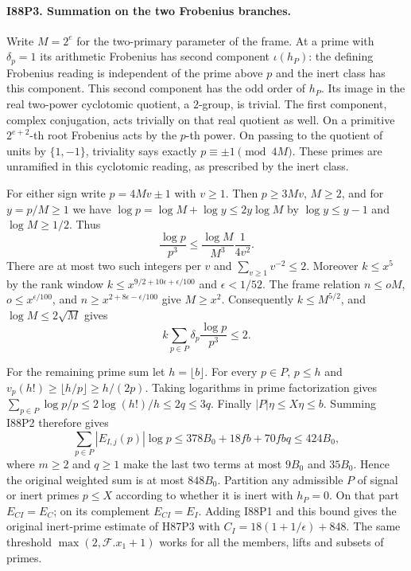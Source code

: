 \paragraph{I88P3. Summation on the two Frobenius branches.}
Write $M=2^e$ for the two-primary parameter of the frame. At a
prime with $\delta_p=1$ its arithmetic Frobenius has second
component $\iota(h_P)$: the defining Frobenius reading is independent
of the prime above $p$ and the inert class has this component.
This second component has the odd order of $h_P$. Its image in the
real two-power cyclotomic quotient, a $2$-group, is trivial.
The first component, complex conjugation, acts trivially on that
real quotient as well.
On a primitive $2^{e+2}$-th root Frobenius acts by the $p$-th power.
On passing to the quotient of units by $\{1,-1\}$, triviality
says exactly $p\equiv\pm1\pmod{4M}$. These primes are unramified
in this cyclotomic reading, as prescribed by the inert class.

For either sign write $p=4Mv\pm1$ with $v\ge1$. Then $p\ge3Mv$,
$M\ge2$, and for $y=p/M\ge1$ we have
$\log p=\log M+\log y\le2y\log M$ by $\log y\le y-1$ and
$\log M\ge1/2$. Thus
\[
 \frac{\log p}{p^3}\le
    \frac{\log M}{M^3}\frac1{4v^2}.
\]
There are at most two such integers per $v$ and
$\sum_{v\ge1}v^{-2}\le2$. Moreover $k\le x^5$ by the rank
window $k\le x^{9/2+10\epsilon+\epsilon/100}$ and $\epsilon<1/52$.
The frame relation $n\le oM$, $o\le x^{\epsilon/100}$, and
$n\ge x^{2+8\epsilon-\epsilon/100}$ give $M\ge x^2$.
Consequently $k\le M^{5/2}$, and $\log M\le2\sqrt M$ gives
\[
 k\sum_{p\in P}\delta_p\frac{\log p}{p^3}\le2 .
\]

For the remaining prime sum let $h=\lfloor b\rfloor$. For every
$p\in P$, $p\le h$ and $v_p(h!)\ge\lfloor h/p\rfloor\ge h/(2p)$.
Taking logarithms in prime factorization gives
$\sum_{p\in P}\log p/p\le 2\log(h!)/h\le2q\le3q$.
Finally $|P|\eta\le X\eta\le b$. Summing I88P2 therefore gives
\[
 \sum_{p\in P}|E_{I,j}(p)|\log p
 \le378B_0+18fb+70fbq\le424B_0 ,
\]
where $m\ge2$ and $q\ge1$ make the last two terms at most
$9B_0$ and $35B_0$. Hence the original weighted sum is at most
$848B_0$. Partition any admissible $P$ of signal or inert primes
$p\le X$ according to whether it is inert with $h_P=0$.
On that part $E_{CI}=E_C$; on its complement $E_{CI}=E_I$.
Adding I88P1 and this bound gives the original inert-prime estimate
of H87P3 with $C_I=18(1+1/\epsilon)+848$.
The same threshold $\max(2,\mathcal F.x_1+1)$ works for all the
members, lifts and subsets of primes.
